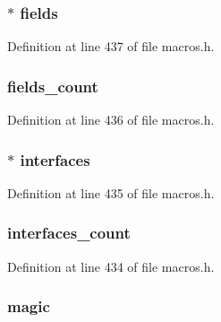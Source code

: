\subsubsection[{fields}]{$\ast$ fields}\label{struct_class_file_ae01d16d1ab715a4f5dd1fe8254322594}


Definition at line 437 of file macros.\+h.

\hypertarget{struct_class_file_a8bebe0bfa4e37dde1e67c6a72af398c0}{}
\subsubsection[{fields\+\_\+count}]{ fields\+\_\+count}\label{struct_class_file_a8bebe0bfa4e37dde1e67c6a72af398c0}


Definition at line 436 of file macros.\+h.

\hypertarget{struct_class_file_a31608612612ea019eef47ae5d656dc23}{}
\subsubsection[{interfaces}]{$\ast$ interfaces}\label{struct_class_file_a31608612612ea019eef47ae5d656dc23}


Definition at line 435 of file macros.\+h.

\hypertarget{struct_class_file_a5d766202b705d1bdb025a0e7fff8953c}{}
\subsubsection[{interfaces\+\_\+count}]{ interfaces\+\_\+count}\label{struct_class_file_a5d766202b705d1bdb025a0e7fff8953c}


Definition at line 434 of file macros.\+h.

\hypertarget{struct_class_file_a9c187266c328a40ddc2dde8c8a230a65}{}
\subsubsection[{magic}]{ magic}\label{struct_class_file_a9c187266c328a40ddc2dde8c8a230a65}


